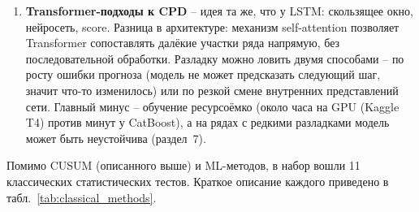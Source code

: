 \documentclass[12pt,a4paper]{article}
\begin{document}
\begin{enumerate}
    \textit{LSTM (Long Short-Term Memory)} оснащен механизмом памяти ячейки (cell state) и тремя вентилями (входным, забывания и выходным), что позволяет явно управлять долгосрочной памятью и потенциально полезно для улавливания отложенных или постепенных разладок. Модель содержит больше параметров и требует существенно большего времени обучения.

    \textit{GRU (Gated Recurrent Unit)} упрощает LSTM до двух вентилей  -- сброса и обновления  -- без отдельного cell state. GRU имеет меньше параметров и обучается быстрее при сопоставимом качестве на контекстах средней длины. GRU включен как контрольное сравнение: если он покажет результат, близкий к LSTM, значит, дело в самой рекуррентности, а не в механизме cell state. У обоих методов общие слабости: им нужно много обучающих данных, и они могут переобучиться на конкретный тип шума. Кроме того, в отличие от классических тестов, у нейросетей нет формальных гарантий на долю ложных срабатываний  -- порог подбирается эмпирически.
    
    \item \textbf{Transformer-подходы к CPD}  -- идея та же, что у LSTM: скользящее окно, нейросеть, score. Разница в архитектуре: механизм self-attention позволяет Transformer сопоставлять далёкие участки ряда напрямую, без последовательной обработки. Разладку можно ловить двумя способами  -- по росту ошибки прогноза (модель не может предсказать следующий шаг, значит что-то изменилось) или по резкой смене внутренних представлений сети. Главный минус  -- обучение ресурсоёмко (около часа на GPU (Kaggle T4) против минут у CatBoost), а на рядах с редкими разладками модель может быть неустойчива (раздел~7).
\end{enumerate}

Помимо CUSUM (описанного выше) и ML-методов, в набор вошли 11 классических статистических тестов. Краткое описание каждого приведено в табл.~\ref{tab:classical_methods}.
\end{document}
